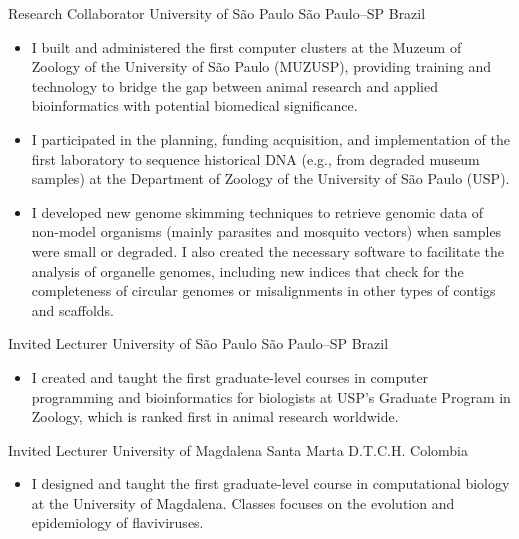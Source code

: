 \documentclass[11pt, letterpaper, sans]{moderncv}
\begin{document}
    \vspace{-0.5em}
    	{Research Collaborator}
    	{University of São Paulo}
    	{São Paulo--SP}
    	{Brazil}
    	{}
    \vspace{-1em}
    \begin{itemize}[itemsep=-0.05in, labelindent=0in, leftmargin=1cm]\small
	    \item[\textcolor{color1}{\textbullet}] I built and administered the first computer clusters at the Muzeum of Zoology of the University of São Paulo (MUZUSP), providing training and technology to bridge the gap between animal research and applied bioinformatics with potential biomedical significance.
	    \item[\textcolor{color1}{\textbullet}] I participated in the planning, funding acquisition, and implementation of the first laboratory to sequence historical DNA (e.g., from degraded museum samples) at the Department of Zoology of the University of São Paulo (USP).
	    \item[\textcolor{color1}{\textbullet}] I developed new genome skimming techniques to retrieve genomic data of non-model organisms (mainly parasites and mosquito vectors) when samples were small or degraded. I also created the necessary software to facilitate the analysis of organelle genomes, including new indices that check for the completeness of circular genomes or misalignments in other types of contigs and scaffolds.
    \end{itemize}
    	{Invited Lecturer}
    	{University of São Paulo}
    	{São Paulo--SP}
    	{Brazil}
    	{}
    \vspace{-1em}
    \begin{itemize}[itemsep=-0.05in, labelindent=0in, leftmargin=1cm]\small
	    \item[\textcolor{color1}{\textbullet}] I created and taught the first graduate-level courses in computer programming and bioinformatics for biologists at USP's Graduate Program in Zoology, which is ranked first in animal research worldwide.
	\end{itemize}
    \vspace{-0.5em}
    	{Invited Lecturer}
    	{University of Magdalena}
    	{Santa Marta D.T.C.H.}
    	{Colombia}
    	{}
    \vspace{-1em}
    \begin{itemize}[itemsep=-0.05in, labelindent=0in, leftmargin=1cm]\small
	    \item[\textcolor{color1}{\textbullet}] I designed and taught the first graduate-level course in computational biology at the University of Magdalena. Classes focuses on the evolution and epidemiology of flaviviruses.
	\end{itemize}
\end{document}
